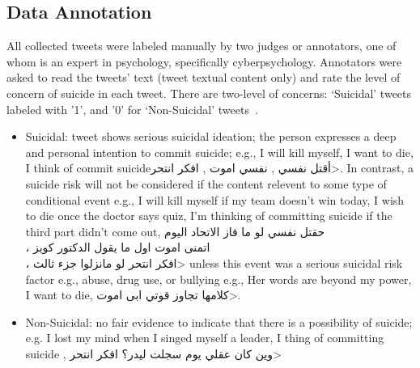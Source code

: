\documentclass[sn-mathphys,Numbered]{sn-jnl}%
\begin{document}




\subsection{Data Annotation}
\label{subSec:data ann} 
All collected tweets were labeled manually by two judges or annotators, one of whom is an expert in psychology, specifically cyberpsychology. Annotators were asked to read the tweets’ text (tweet textual content only) and rate the level of concern of suicide in each tweet. There are two-level of concerns: ‘Suicidal’ tweets labeled with '1', and '0' for ‘Non-Suicidal’ tweets~\cite{word2ODEA2015183}.

\begin{itemize}
\item Suicidal: tweet shows serious suicidal ideation; the person expresses a deep and personal intention to commit suicide; e.g., I will kill myself, I want to die, I think of commit suicide\<أقتل نفسي , نفسي اموت , افكر انتحر>. In contrast, a  suicide risk will not be considered if the content relevent to some type of conditional event e.g., I will kill myself if my team doesn't win today, I wish to die once the doctor says quiz, I'm thinking of committing suicide if the third part didn't come out, \<حقتل نفسي لو ما فاز الاتحاد اليوم \\، اتمنى اموت اول ما يقول الدكتور كويز \\، افكر انتحر لو مانزلوا جزء ثالث> unless this event was a serious suicidal risk factor e.g., abuse, drug use, or bullying e.g., Her words are beyond my power, I want to die, \<كلامها تجاوز قوتي ابى اموت>.
\item Non-Suicidal: no fair evidence to indicate that there is a possibility of suicide; 
e.g. I lost my mind when I singed myself a leader, I thing of committing suicide , \<وين كان عقلي يوم سجلت  ليدر؟ 
افكر انتحر>
\end{itemize} %
\end{document}
